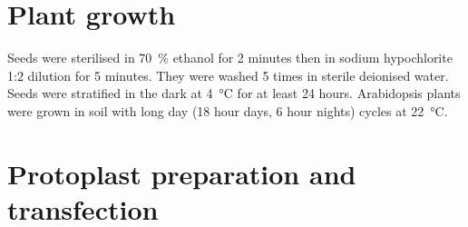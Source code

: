 \documentclass[../main.tex]{subfiles}
\begin{document}
\section{Plant growth}{\label{chapter2:methods:plant-growth}}

Seeds were sterilised in \SI{70}{\percent} ethanol for 2 minutes then in sodium hypochlorite 1:2 dilution for 5 minutes.
They were washed 5 times in sterile deionised water.
Seeds were stratified in the dark at \SI{4}{\degreeCelsius} for at least 24 hours.
Arabidopsis plants were grown in soil with long day (18 hour days, 6 hour nights) cycles at \SI{22}{\degreeCelsius}.

\section{Protoplast preparation and transfection}\label{chapter2:methods:protoplast-preparation-and-transfection}
\end{document}
